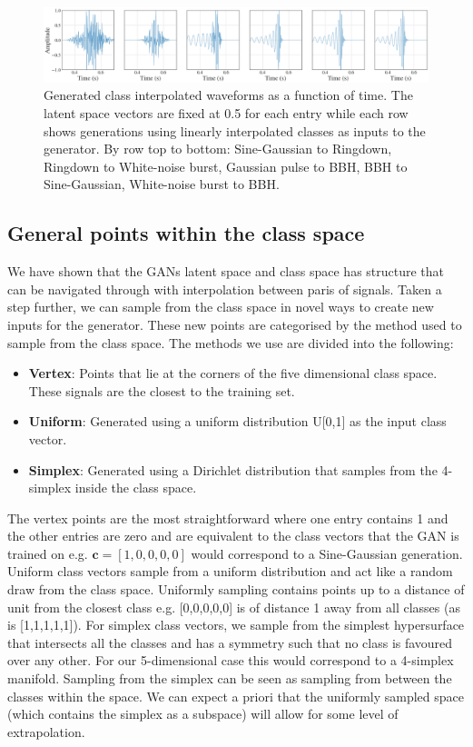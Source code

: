 \documentclass[12pt]{iopart}
\begin{document}
\begin{figure}
    \includegraphics[width=\textwidth]{figures/generations/wnb-bbh.png}
    \caption{Generated class interpolated waveforms as a function of time. The latent space vectors are fixed at 0.5 for each entry while each row shows generations using linearly interpolated classes as inputs to the generator. By row top to bottom: Sine-Gaussian to Ringdown, Ringdown to White-noise burst, Gaussian pulse to BBH, BBH to Sine-Gaussian, White-noise burst to BBH.}
    \label{fig:c_interp}
\end{figure}

\subsection{General points within the class space}
We have shown that the \acp{GAN} latent space and class space has structure that can be navigated through with interpolation between paris of signals. Taken a step further, we can sample from the class space in novel ways to create new inputs for the generator. These new points are categorised by the method used to sample from the class space. The methods we use are divided into the following: 

\begin{itemize}
%
\item {\bf Vertex}: Points that lie at the corners of the five dimensional class space.
These signals are the closest to the training set.
%
\item {\bf Uniform}: Generated using a uniform distribution U[0,1] as the input
class vector.
%
\item {\bf Simplex}: Generated using a Dirichlet distribution that samples from the
4-simplex inside the class space.
%
\end{itemize}

The vertex points are the most straightforward where one entry contains 1 and the other entries are zero and are equivalent to the class vectors that the GAN is trained on e.g. $\mathbf{c} = [1,0,0,0,0]$ would correspond to a Sine-Gaussian generation. Uniform class vectors sample from a uniform distribution and act like a random draw from the class space. Uniformly sampling contains points up to a distance of unit from the closest class e.g. [0,0,0,0,0] is of distance 1 away from all classes (as is [1,1,1,1,1]). For simplex class vectors, we sample from the simplest hypersurface that intersects all the classes and has a symmetry such that no class is favoured over any other. For our 5-dimensional case this would correspond to a 4-simplex manifold. Sampling from the simplex can be seen as sampling from between the classes within the space. We can expect a priori that the uniformly sampled space (which contains the simplex as a subspace) will allow for some level of extrapolation. 
\end{document}
